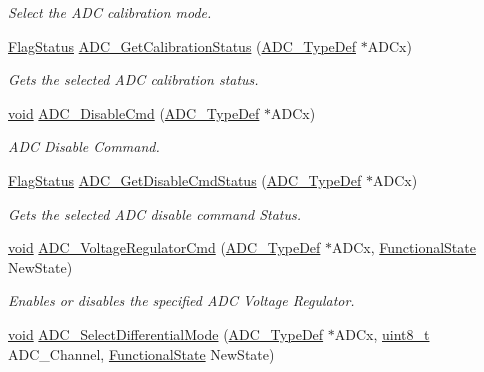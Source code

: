 \begin{DoxyCompactItemize}
\begin{DoxyCompactList}\small\item\em Select the A\-D\-C calibration mode. \end{DoxyCompactList}\item 
\hyperlink{group___exported__types_ga89136caac2e14c55151f527ac02daaff}{Flag\-Status} \hyperlink{group___a_d_c___group1_ga7a728f699b487c7fa1694d7424967122}{A\-D\-C\-\_\-\-Get\-Calibration\-Status} (\hyperlink{struct_a_d_c___type_def}{A\-D\-C\-\_\-\-Type\-Def} $\ast$A\-D\-Cx)
\begin{DoxyCompactList}\small\item\em Gets the selected A\-D\-C calibration status. \end{DoxyCompactList}\item 
\hyperlink{group___n_a_m_e_ga18028b8badbf1ea7e704ccac3c488e82}{void} \hyperlink{group___a_d_c___group1_ga9f74083ca95c0060fa9903d16ccbe057}{A\-D\-C\-\_\-\-Disable\-Cmd} (\hyperlink{struct_a_d_c___type_def}{A\-D\-C\-\_\-\-Type\-Def} $\ast$A\-D\-Cx)
\begin{DoxyCompactList}\small\item\em A\-D\-C Disable Command. \end{DoxyCompactList}\item 
\hyperlink{group___exported__types_ga89136caac2e14c55151f527ac02daaff}{Flag\-Status} \hyperlink{group___a_d_c___group1_gab34a1c205ee39f6473a28a40620f81e2}{A\-D\-C\-\_\-\-Get\-Disable\-Cmd\-Status} (\hyperlink{struct_a_d_c___type_def}{A\-D\-C\-\_\-\-Type\-Def} $\ast$A\-D\-Cx)
\begin{DoxyCompactList}\small\item\em Gets the selected A\-D\-C disable command Status. \end{DoxyCompactList}\item 
\hyperlink{group___n_a_m_e_ga18028b8badbf1ea7e704ccac3c488e82}{void} \hyperlink{group___a_d_c___group1_gad3fdd98cd57f2cb93c7ea7b710e97921}{A\-D\-C\-\_\-\-Voltage\-Regulator\-Cmd} (\hyperlink{struct_a_d_c___type_def}{A\-D\-C\-\_\-\-Type\-Def} $\ast$A\-D\-Cx, \hyperlink{group___exported__types_gac9a7e9a35d2513ec15c3b537aaa4fba1}{Functional\-State} New\-State)
\begin{DoxyCompactList}\small\item\em Enables or disables the specified A\-D\-C Voltage Regulator. \end{DoxyCompactList}\item 
\hyperlink{group___n_a_m_e_ga18028b8badbf1ea7e704ccac3c488e82}{void} \hyperlink{group___a_d_c___group1_ga451e4ae6d52275b723aa953d72b7e325}{A\-D\-C\-\_\-\-Select\-Differential\-Mode} (\hyperlink{struct_a_d_c___type_def}{A\-D\-C\-\_\-\-Type\-Def} $\ast$A\-D\-Cx, \hyperlink{stdint_8h_aba7bc1797add20fe3efdf37ced1182c5}{uint8\-\_\-t} A\-D\-C\-\_\-\-Channel, \hyperlink{group___exported__types_gac9a7e9a35d2513ec15c3b537aaa4fba1}{Functional\-State} New\-State)

\end{DoxyCompactItemize}

